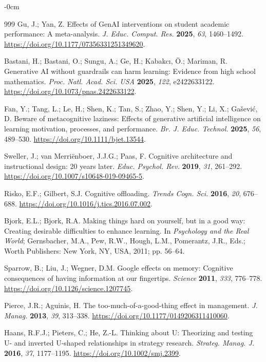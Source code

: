 \documentclass[sustainability,article,accept,moreauthors]{Definitions/mdpi}
\begin{document}
\begin{adjustwidth}{-\extralength}{0cm}
\begin{thebibliography}{999}
Gu, J.; Yan, Z. Effects of GenAI interventions on student academic performance: A meta-analysis. \textit{J. Educ. Comput. Res.} \textbf{2025}, \textit{63}, 1460--1492. \url{https://doi.org/10.1177/07356331251349620}.

Bastani, H.; Bastani, O.; Sungu, A.; Ge, H.; Kabakc{\i}, {\"O}.; Mariman, R. Generative AI without guardrails can harm learning: Evidence from high school mathematics. \textit{Proc. Natl. Acad. Sci. USA} \textbf{2025}, \textit{122}, e2422633122. \url{https://doi.org/10.1073/pnas.2422633122}.

Fan, Y.; Tang, L.; Le, H.; Shen, K.; Tan, S.; Zhao, Y.; Shen, Y.; Li, X.; Ga{\v{s}}evi{\'c}, D. Beware of metacognitive laziness: Effects of generative artificial intelligence on learning motivation, processes, and performance. \textit{Br. J. Educ. Technol.} \textbf{2025}, \textit{56}, 489--530. \url{https://doi.org/10.1111/bjet.13544}.

Sweller, J.; van Merri{\"e}nboer, J.J.G.; Paas, F. Cognitive architecture and instructional design: 20 years later. \textit{Educ. Psychol. Rev.} \textbf{2019}, \textit{31}, 261--292. \url{https://doi.org/10.1007/s10648-019-09465-5}.

Risko, E.F.; Gilbert, S.J. Cognitive offloading. \textit{Trends Cogn. Sci.} \textbf{2016}, \textit{20}, 676--688. \url{https://doi.org/10.1016/j.tics.2016.07.002}.

Bjork, E.L.; Bjork, R.A. Making things hard on yourself, but in a good way: Creating desirable difficulties to enhance learning. In \textit{Psychology and the Real World}; Gernsbacher, M.A., Pew, R.W., Hough, L.M., Pomerantz, J.R., Eds.; Worth Publishers: New York, NY, USA, 2011; pp. 56--64.

Sparrow, B.; Liu, J.; Wegner, D.M. Google effects on memory: Cognitive consequences of having information at our fingertips. \textit{Science} \textbf{2011}, \textit{333}, 776--778. \url{https://doi.org/10.1126/science.1207745}.

Pierce, J.R.; Aguinis, H. The too-much-of-a-good-thing effect in management. \textit{J. Manag.} \textbf{2013}, \textit{39}, 313--338. \url{https://doi.org/10.1177/0149206311410060}.

Haans, R.F.J.; Pieters, C.; He, Z.-L. Thinking about U: Theorizing and testing U- and inverted U-shaped relationships in strategy research. \textit{Strateg. Manag. J.} \textbf{2016}, \textit{37}, 1177--1195. \url{https://doi.org/10.1002/smj.2399}.


\end{thebibliography}
\end{adjustwidth}
\end{document}
